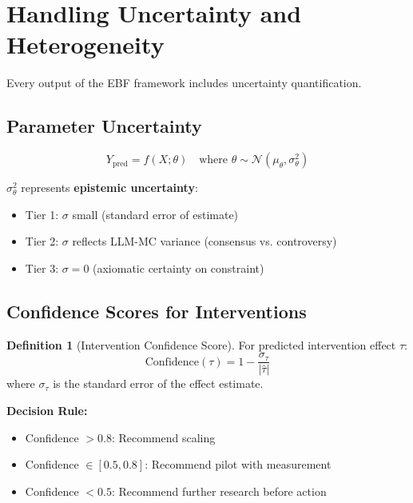\documentclass[11pt,a4paper]{article}
\theoremstyle{definition}
\newtheorem{definition}{Definition}[section]
\begin{document}
\section{Handling Uncertainty and Heterogeneity}
\label{sec:bbb-uncertainty}

Every output of the EBF framework includes uncertainty quantification.

\subsection{Parameter Uncertainty}

\begin{equation}
Y_{\text{pred}} = f(X; \theta) \quad \text{where } \theta \sim \mathcal{N}(\mu_\theta, \sigma^2_\theta)
\end{equation}

$\sigma^2_\theta$ represents \textbf{epistemic uncertainty}:
\begin{itemize}
    \item Tier 1: $\sigma$ small (standard error of estimate)
    \item Tier 2: $\sigma$ reflects LLM-MC variance (consensus vs. controversy)
    \item Tier 3: $\sigma = 0$ (axiomatic certainty on constraint)
\end{itemize}

\subsection{Confidence Scores for Interventions}

\begin{definition}[Intervention Confidence Score]
For predicted intervention effect $\tau$:
\begin{equation}
\text{Confidence}(\tau) = 1 - \frac{\sigma_\tau}{|\hat{\tau}|}
\end{equation}
where $\sigma_\tau$ is the standard error of the effect estimate.
\end{definition}

\textbf{Decision Rule:}
\begin{itemize}
    \item Confidence $> 0.8$: Recommend scaling
    \item Confidence $\in [0.5, 0.8]$: Recommend pilot with measurement
    \item Confidence $< 0.5$: Recommend further research before action
\end{itemize}
\end{document}
